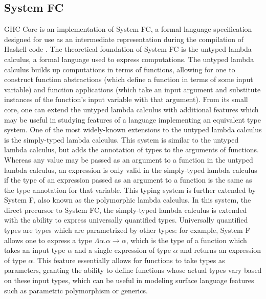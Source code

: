 \documentclass{sig-alternate}
\begin{document}
\subsection{System FC}
\label{sec:background-fc}

GHC Core is an implementation of System FC, a formal language specification designed for use as an intermediate representation during the compilation of Haskell code \cite{conf/tldi/SulzmannCJD07}. The theoretical foundation of System FC is the untyped lambda calculus, a formal language used to express computations. The untyped lambda calculus builds up computations in terms of functions, allowing for one to construct function abstractions (which define a function in terms of some input variable) and function applications (which take an input argument and substitute instances of the function's input variable with that argument). From its small core, one can extend the untyped lambda calculus with additional features which may be useful in studying features of a language implementing an equivalent type system. One of the most widely-known extensions to the untyped lambda calculus is the simply-typed lambda calculus. This system is similar to the untyped lambda calculus, but adds the annotation of types to the arguments of functions. Whereas any value may be passed as an argument to a function in the untyped lambda calculus, an expression is only valid in the simply-typed lambda calculus if the type of an expression passed as an argument to a function is the same as the type annotation for that variable. This typing system is further extended by System F, also known as the polymorphic lambda calculus. In this system, the direct precursor to System FC, the simply-typed lambda calculus is extended with the ability to express universally quantified types. Universally quantified types are types which are parametrized by other types: for example, System F allows one to express a type $\Lambda\alpha.\alpha\rightarrow\alpha$, which is the type of a function which takes an input type $\alpha$ and a single expression of type $\alpha$ and returns an expression of type $\alpha$. This feature essentially allows for functions to take types as parameters, granting the ability to define functions whose actual types vary based on these input types, which can be useful in modeling surface language features such as parametric polymorphism or generics. 
\end{document}
